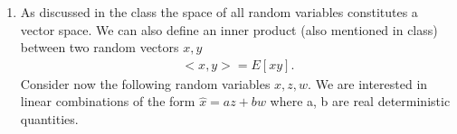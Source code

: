 \documentclass[letter, 12pt]{article}
\begin{document}
\begin{enumerate}[wide = 0pt, label = \textbf{Problem \arabic*:}]
		\item {As discussed in the class the space of all random variables constitutes a vector space. We can also define an inner product (also mentioned in class) between two random vectors $ x, y $ 
			\begin{align*}
				<x, y>= E[xy].
			\end{align*} Consider now the following random variables $ x, z, w $. We are interested in linear combinations of the form $ \hat{x}= az + bw $ where a, b are real deterministic quantities.}
	\end{enumerate}
\end{document}
